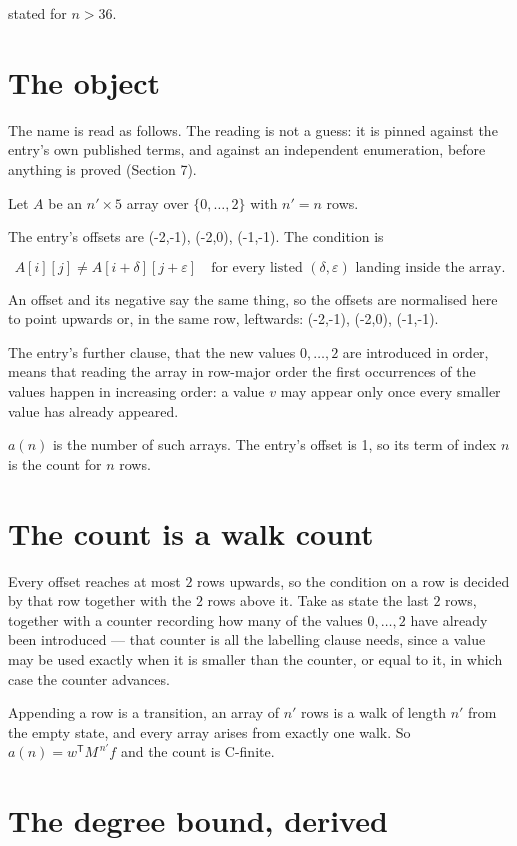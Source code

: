 \documentclass[11pt]{article}
\theoremstyle{definition}
\begin{document}
stated for $n > 36$.

\section{The object}

The name is read as follows. The reading is not a guess: it is pinned against the entry's own published terms, and against an independent enumeration, before anything is proved (Section 7).

Let $A$ be an $n' \times 5$ array over $\{0,\dots,2\}$ with $n' = n$ rows.

The entry's offsets are (-2,-1), (-2,0), (-1,-1). The condition is

\[A[i][j] \ne A[i{+}\delta][j{+}\varepsilon]\quad\text{for every listed }(\delta,\varepsilon)\text{ landing inside the array.}\]

An offset and its negative say the same thing, so the offsets are normalised here to point upwards or, in the same row, leftwards: (-2,-1), (-2,0), (-1,-1).

The entry's further clause, that the new values $0,\dots,2$ are introduced in order, means that reading the array in row-major order the first occurrences of the values happen in increasing order: a value $v$ may appear only once every smaller value has already appeared.

$a(n)$ is the number of such arrays. The entry's offset is 1, so its term of index $n$ is the count for $n$ rows.

\section{The count is a walk count}

Every offset reaches at most $2$ rows upwards, so the condition on a row is decided by that row together with the $2$ rows above it. Take as state the last $2$ rows, together with a counter recording how many of the values $0,\dots,2$ have already been introduced --- that counter is all the labelling clause needs, since a value may be used exactly when it is smaller than the counter, or equal to it, in which case the counter advances.

Appending a row is a transition, an array of $n'$ rows is a walk of length $n'$ from the empty state, and every array arises from exactly one walk. So $a(n) = w^{\mathsf T}M^{\,n'}f$ and the count is C-finite.

\section{The degree bound, derived}
\end{document}
